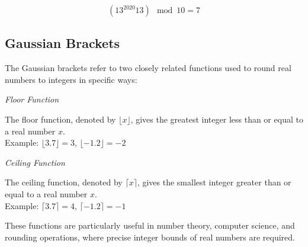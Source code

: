 \[(13^{2020} 13) \mod 10 = 7\]

\subsection{Gaussian Brackets}

The Gaussian brackets refer to two closely related functions used to round real numbers to integers in specific ways:

\emph{Floor Function}

The floor function, denoted by \(\lfloor x \rfloor\), gives the greatest integer less than or equal to a real number \(x\). \\
    Example: \(\lfloor 3.7 \rfloor = 3\), \(\lfloor -1.2 \rfloor = -2\)

\emph{Ceiling Function} 
    
The ceiling function, denoted by \(\lceil x \rceil\), gives the smallest integer greater than or equal to a real number \(x\). \\
    Example: \(\lceil 3.7 \rceil = 4\), \(\lceil -1.2 \rceil = -1\)

These functions are particularly useful in number theory, computer science, and rounding operations, where precise integer bounds of real numbers are required.

